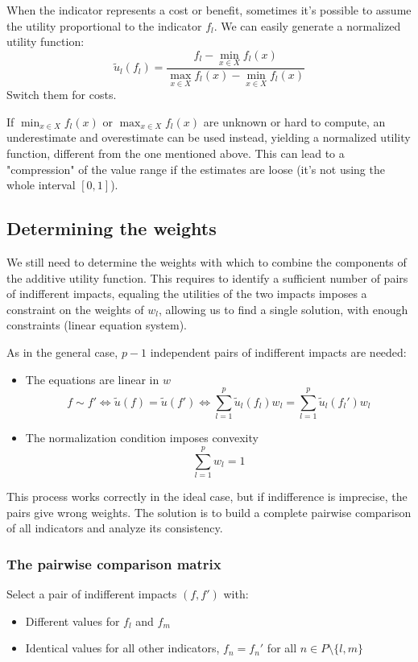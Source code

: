 When the indicator represents a cost or benefit, sometimes it's possible to assume the utility proportional to the indicator $f_l$. We can easily generate a normalized utility function:
$$ \tilde u_l (f_l) = \frac{f_l - \min_{x \in X} f_l (x)}{\max_{x \in X} f_l (x) - \min_{x \in X} f_l (x)} $$
Switch them for costs.

If $\min_{x \in X} f_l (x)$ or $\max_{x \in X} f_l (x)$ are unknown or hard to compute, an underestimate and overestimate can be used instead, yielding a normalized utility function, different from the one mentioned above. This can lead to a "compression" of the value range if the estimates are loose (it's not using the whole interval $[0,1]$).

\subsection{Determining the weights}
\label{subsec:detweights}

We still need to determine the weights with which to combine the components of the additive utility function. This requires to identify a sufficient number of pairs of indifferent impacts, equaling the utilities of the two impacts imposes a constraint on the weights of $w_l$, allowing us to find a single solution, with enough constraints (linear equation system).

As in the general case, $p-1$ independent pairs of indifferent impacts are needed: 
\begin{itemize}
	\item The equations are linear in $w$ 
	$$ f \sim f' \Leftrightarrow \tilde u (f) = \tilde u (f') \Leftrightarrow \sum_{l = 1}^p \tilde u_l (f_l) w_l = \sum_{l = 1}^p \tilde u_l (f_l') w_l$$
	
	\item The normalization condition imposes convexity 
	$$ \sum_{l = 1}^p w_l = 1$$
\end{itemize}

This process works correctly in the ideal case, but if indifference is imprecise, the pairs give wrong weights. The solution is to build a complete pairwise comparison of all indicators and analyze its consistency.

\subsubsection{The pairwise comparison matrix}

Select a pair of indifferent impacts $(f, f')$ with:
\begin{itemize}
	\item Different values for $f_l$ and $f_m$
	
	\item Identical values for all other indicators, $f_n = f_n'$ for all $n \in P \setminus \{l, m\}$
\end{itemize}

